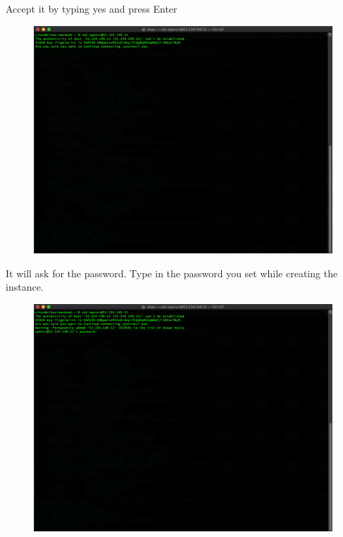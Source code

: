 Accept it by typing yes and press Enter

\begin{figure}[H]
\begin{center} 
\includegraphics[scale=0.30]{figures/ssh5}
\end{center}
\end{figure}

It will ask for the password. Type in the password you set while creating the instance.

\begin{figure}[H]
\begin{center} 
\includegraphics[scale=0.30]{figures/ssh6}
\end{center}
\end{figure}

